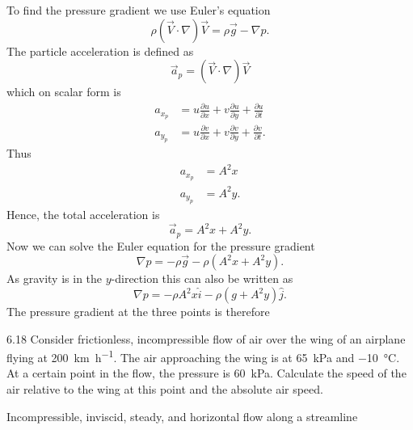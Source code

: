 \begin{derivation}
  To find the pressure gradient we use Euler's equation
  \[ 
    \rho \left( \Vec{V} \cdot \nabla  \right) \Vec{V} = \rho \Vec{g} - \nabla p
  .\]
  The particle acceleration is defined as
  \[ 
  \Vec{a}_p = \left( \Vec{V} \cdot \nabla  \right) \Vec{V}
  \]
  which on scalar form is
  \begin{align*}
    a_{x_p} &= u \frac{\partial u}{\partial x} + v \frac{\partial u}{\partial y} + \frac{\partial u}{\partial t}  \\
    a_{y_p} &= u \frac{\partial v}{\partial x} + v \frac{\partial v}{\partial y} + \frac{\partial v}{\partial t} 
  .\end{align*}
  Thus
  \begin{align*}
    a_{x_p} &= A^2x \\
    a_{y_p} &= A^2 y
  .\end{align*}
  Hence, the total acceleration is
  \[ 
  \Vec{a}_p = A^2x + A^2 y
  .\]
  Now we can solve the Euler equation for the pressure gradient
  \[ 
  \nabla  p = - \rho \Vec{g} - \rho \left( A^2 x + A^2y \right)
  .\]
  As gravity is in the $y$-direction this can also be written as
  \[ 
  \nabla p = - \rho A^2 x \hat{i} - \rho \left( g + A^2 y \right) \hat{j}
  .\]
  The pressure gradient at the three points is therefore
\end{derivation}  

\begin{problem}{6.18}
  Consider frictionless, incompressible flow of air over the wing of an airplane flying at \qty{200}{\km\per\hour}.
  The air approaching the wing is at \qty{65}{\kPa} and \qty{-10}{\celsius}.
  At a certain point in the flow, the pressure is \qty{60}{\kPa}.
  Calculate the speed of the air relative to the wing at this point and the absolute air speed.
\end{problem}

\begin{assumptions}
  \item Incompressible, inviscid, steady, and horizontal flow along a streamline
\end{assumptions}

